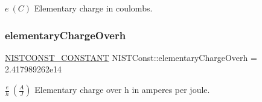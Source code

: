 $e \ (C)$ Elementary charge in coulombs. \mbox{\label{group___n_i_s_t_const-_elementary_charge_gae14d69d686990378677cd8072ce9873b}} 
\subsubsection{\texorpdfstring{elementary\+Charge\+Overh}{elementaryChargeOverh}}
{\footnotesize\ttfamily \mbox{\hyperlink{group___n_i_s_t_const-_macros_ga2b0fc1d7452373f816175dd86ce26729}{N\+I\+S\+T\+C\+O\+N\+S\+T\+\_\+\+C\+O\+N\+S\+T\+A\+NT}} N\+I\+S\+T\+Const\+::elementary\+Charge\+Overh = 2.\+417989262e14}

$\frac{e}{h} \ (\frac{A}{J})$ Elementary charge over h in amperes per joule. 